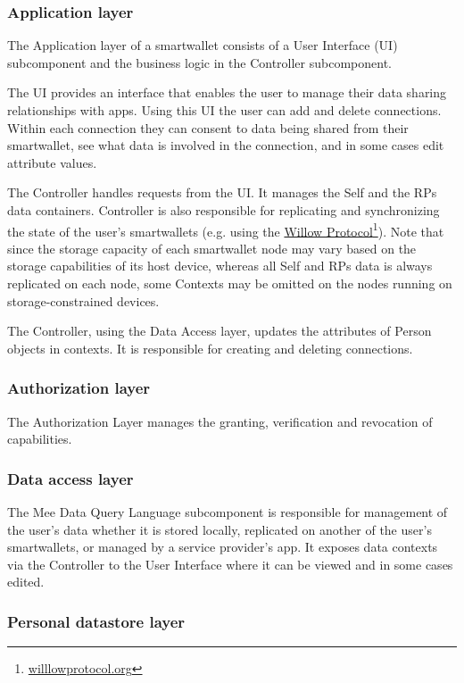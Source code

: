 \documentclass[11pt, oneside]{article}   	%
\newcommand{\hyperfootnote}[1][]{\def\ArgI{{#1}}\hyperfootnoteRelay}
\newcommand\hyperfootnoteRelay[2][]{\href{#1#2}{\ArgI}\footnote{\href{#1#2}{#2}}}
\begin{document}
\subsubsection{Application layer}

The Application layer of a smartwallet consists of a User Interface (UI) subcomponent and the business logic in the Controller subcomponent. 

The UI provides an interface that enables the user to manage their data sharing relationships with apps. Using this UI the user can add and delete connections. Within each connection they can consent to data being shared from their smartwallet, see what data is involved in the connection, and in some cases edit attribute values. 

The Controller handles requests from the UI. It manages the Self and the RPs data containers. Controller is also responsible for replicating and synchronizing the state of the user's smartwallets (e.g. using the \hyperfootnote[Willow Protocol][https://]{willlowprotocol.org}). Note that since the storage capacity of each smartwallet node may vary based on the storage capabilities of its host device, whereas all Self and RPs data is always replicated on each node, some Contexts may be omitted on the nodes running on storage-constrained devices.

The Controller, using the Data Access layer, updates the attributes of Person objects in contexts. It is responsible for creating and deleting connections.

\subsubsection{Authorization layer}

The Authorization Layer manages the granting, verification and revocation of capabilities. 

\subsubsection{Data access layer}

The Mee Data Query Language subcomponent is responsible for management of the user’s data whether it is stored locally, replicated on another of the user's smartwallets, or managed by a service provider's app. It exposes data contexts via the Controller to the User Interface where it can be viewed and in some cases edited. 

\subsubsection{Personal datastore layer}
\end{document}

